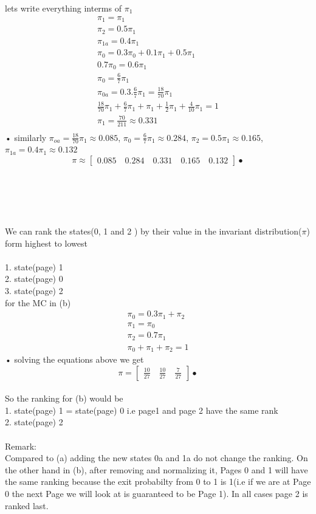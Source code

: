 \documentclass[a4paper,11pt]{report}
\begin{document}
lets write everything interms of $\pi_1$\\

\begin{eqnarray}
\pi_1=\pi_1\\
\pi_2=0.5\pi_1\\
\pi_{1a}=0.4\pi_1\\
\pi_0 = 0.3\pi_0 + 0.1\pi_1 + 0.5\pi_1\\
0.7\pi_0=0.6\pi_1\\
\pi_0 = \frac{6}{7}\pi_1\\
\pi_{0a} = 0.3.\frac{6}{7}\pi_1=\frac{18}{70}\pi_1\\
\frac{18}{70}\pi_1+\frac{6}{7}\pi_1+\pi_1+\frac{1}{2}\pi_1+\frac{4}{10}\pi_1 = 1\\
\pi_1 = \frac{70}{211}\approx 0.331\\
\end{eqnarray}•
similarly  $\pi_{oa} = \frac{18}{70}\pi_1\approx0.085$, $\pi_0=\frac{6}{7}\pi_1\approx0.284$, $\pi_2=0.5\pi_1\approx0.165$, $\pi_{1a}=0.4\pi_1\approx0.132$
$$
\pi \approx \begin{bmatrix}
0.085 \quad 0.284 \quad 0.331 \quad 0.165 \quad 0.132    
\end{bmatrix}•
$$
\\\\\\\\\\We can rank the states(0, 1  and 2 ) by their value in the invariant distribution($\pi$) form highest to lowest\\\\
1. state(page) 1\\
2. state(page) 0\\
3. state(page) 2\\


for the MC in (b)
\begin{eqnarray}
\pi_0  = 0.3\pi_1 + \pi_2\\
\pi_1  = \pi_0\\
\pi_2  = 0.7\pi_1\\
\pi_0+\pi_1+\pi_2=1
\end{eqnarray}•
solving the equations above we get\\
$$
\pi = \begin{bmatrix}
\frac{10}{27} \quad \frac{10}{27} \quad \frac{7}{27}    
\end{bmatrix}•
$$\\
So the ranking for (b) would be \\
1. state(page) 1 = state(page) 0 \quad i.e page1 and page 2 have the same rank\\
2. state(page) 2\\\\
Remark:\\
Compared to (a) adding the new states 0a and 1a do not change the ranking. On the other hand in (b), after removing and normalizing it, Pages 0 and 1 will have the same ranking because the exit probabilty  from 0 to 1 is 1(i.e if we are at Page 0 the next Page we will look at is guaranteed to be Page 1). In all cases page 2 is ranked last.
\end{document}
